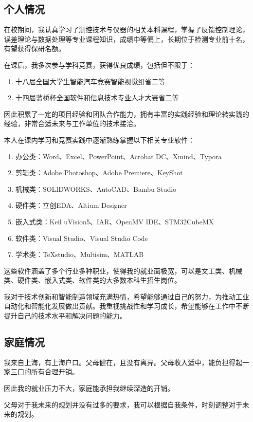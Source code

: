 \documentclass{ctexart}
\begin{document}
		\subsection{个人情况}
			在校期间，我认真学习了测控技术与仪器的相关本科课程，掌握了反馈控制理论，误差理论与数据处理等专业课程知识，成绩中等偏上，长期位于检测专业前十名，有望获得保研名额。\par
			在课后，我多次参与学科竞赛，获得优良成绩，包括但不限于：
			\begin{enumerate}
				\item 十八届全国大学生智能汽车竞赛智能视觉组省二等
				\item 十四届蓝桥杯全国软件和信息技术专业人才大赛省二等
			\end{enumerate}\par
			因此积累了一定的项目经验和团队合作能力，拥有丰富的实践经验和理论转实践的经验，非常合适未来与工作单位的技术接洽。\par
			本人在课内学习和竞赛实践中逐渐熟练掌握以下相关专业软件：
			\begin{enumerate}
				\item 办公类：Word、Excel、PowerPoint、Acrobat DC、Xmind、Typora
				\item 剪辑类：Adobe Photoshop、Adobe Premiere、KeyShot
				\item 机械类：SOLIDWORKS、AutoCAD、Bambu Studio
				\item 硬件类：立创EDA、Altium Designer
				\item 嵌入式类：Keil uVision5、IAR、OpenMV IDE、STM32CubeMX
				\item 软件类：Visual Studio、Visual Studio Code
				\item 学术类：TeXstudio、Multisim、MATLAB
			\end{enumerate}\par
			这些软件涵盖了多个行业多种职业，使得我的就业面极宽，可以是文工类、机械类、硬件类、嵌入式类、软件类的大多数本科生招生岗位。\par
			我对于技术创新和智能制造领域充满热情，希望能够通过自己的努力，为推动工业自动化和智能化发展做出贡献。我重视挑战性和学习成长，希望能够在工作中不断提升自己的技术水平和解决问题的能力。
		\subsection{家庭情况}
			我来自上海，有上海户口。父母健在，且没有离异。父母收入适中，能负担得起一家三口的所有合理开销。\par
			因此我的就业压力不大，家庭能承担我继续深造的开销。\par
			父母对于我未来的规划并没有过多的要求，我可以根据自我条件，时刻调整对于未来的规划。
	\newpage
\end{document}
